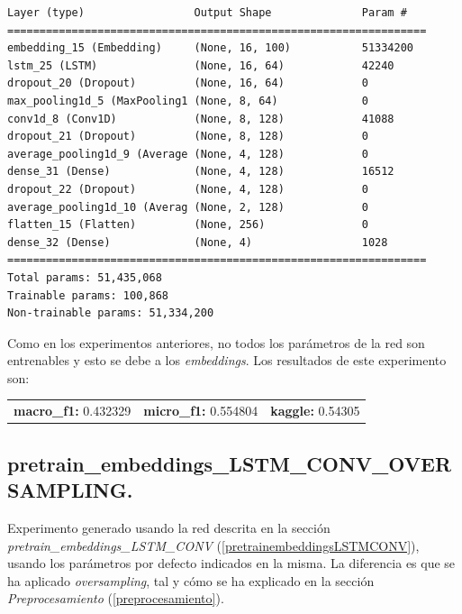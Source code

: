 \documentclass[11pt]{article}
\begin{document}
\begin{verbatim}
Layer (type)                 Output Shape              Param #   
=================================================================
embedding_15 (Embedding)     (None, 16, 100)           51334200  
lstm_25 (LSTM)               (None, 16, 64)            42240     
dropout_20 (Dropout)         (None, 16, 64)            0         
max_pooling1d_5 (MaxPooling1 (None, 8, 64)             0         
conv1d_8 (Conv1D)            (None, 8, 128)            41088     
dropout_21 (Dropout)         (None, 8, 128)            0         
average_pooling1d_9 (Average (None, 4, 128)            0         
dense_31 (Dense)             (None, 4, 128)            16512     
dropout_22 (Dropout)         (None, 4, 128)            0         
average_pooling1d_10 (Averag (None, 2, 128)            0         
flatten_15 (Flatten)         (None, 256)               0         
dense_32 (Dense)             (None, 4)                 1028      
=================================================================
Total params: 51,435,068
Trainable params: 100,868
Non-trainable params: 51,334,200
\end{verbatim}

Como en los experimentos anteriores, no todos los parámetros de la red son entrenables y esto se debe a los \textit{embeddings}. Los resultados de este experimento son: 

\begin{table}[H]
\begin{tabular}{c|c|c}
\textbf{macro\_f1:} 0.432329 & \textbf{micro\_f1:} 0.554804 & \textbf{kaggle:} 0.54305
\end{tabular}
\end{table}

\subsection{pretrain\_embeddings\_LSTM\_CONV\_OVERSAMPLING.} \label{exp_pretrainembeddingsLSTMCONVOVERSAMPLING}

Experimento generado usando la red descrita en la sección \textit{pretrain\_embeddings\_LSTM\_CONV} (\ref{pretrainembeddingsLSTMCONV}), usando los parámetros por defecto indicados en la misma. La diferencia es que se ha aplicado \textit{oversampling}, tal y cómo se ha explicado en la sección \textit{Preprocesamiento} (\ref{preprocesamiento}).
\end{document}
